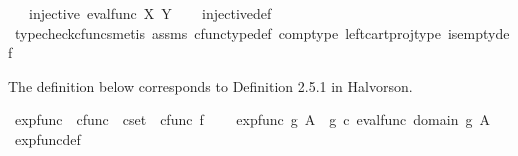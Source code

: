 \begin{isabellebody}
\ \ \ {\isachardoublequoteopen}injective\ {\isacharparenleft}{\kern0pt}eval{\isacharunderscore}{\kern0pt}func\ X\ Y{\isacharparenright}{\kern0pt}{\isachardoublequoteclose}\isanewline
%
\isadelimproof
\ \ %
\endisadelimproof
%
\isatagproof
{}\isamarkupfalse%
\ injective{\isacharunderscore}{\kern0pt}def\isanewline
\ \ \isamarkupfalse%
\ {\isacharparenleft}{\kern0pt}typecheck{\isacharunderscore}{\kern0pt}cfuncs{\isacharcomma}{\kern0pt}metis\ assms\ cfunc{\isacharunderscore}{\kern0pt}type{\isacharunderscore}{\kern0pt}def\ comp{\isacharunderscore}{\kern0pt}type\ left{\isacharunderscore}{\kern0pt}cart{\isacharunderscore}{\kern0pt}proj{\isacharunderscore}{\kern0pt}type\ is{\isacharunderscore}{\kern0pt}empty{\isacharunderscore}{\kern0pt}def{\isacharparenright}{\kern0pt}%
\endisatagproof
{\isafoldproof}%
%
\isadelimproof
%
\endisadelimproof
%
\isadelimdocument
%
\endisadelimdocument
%
\isatagdocument
%
\isamarkuptrue%
%
\endisatagdocument
{\isafolddocument}%
%
\isadelimdocument
%
\endisadelimdocument
%
\begin{isamarkuptext}%
The definition below corresponds to Definition 2.5.1 in Halvorson.%
\end{isamarkuptext}\isamarkuptrue%
\isamarkupfalse%
\ exp{\isacharunderscore}{\kern0pt}func\ {\isacharcolon}{\kern0pt}{\isacharcolon}{\kern0pt}\ {\isachardoublequoteopen}cfunc\ {\isasymRightarrow}\ cset\ {\isasymRightarrow}\ cfunc{\isachardoublequoteclose}\ {\isacharparenleft}{\kern0pt}{\isachardoublequoteopen}{\isacharparenleft}{\kern0pt}{\isacharunderscore}{\kern0pt}{\isacharparenright}{\kern0pt}\isactrlbsup {\isacharunderscore}{\kern0pt}\isactrlesup \isactrlsub f{\isachardoublequoteclose}\ {\isacharbrackleft}{\kern0pt}{}{}{}{\isacharcomma}{\kern0pt}{}{}{}{\isacharbrackright}{\kern0pt}{}{}{}{\isacharparenright}{\kern0pt}\ \isanewline
\ \ {\isachardoublequoteopen}exp{\isacharunderscore}{\kern0pt}func\ g\ A\ {\isacharequal}{\kern0pt}\ {\isacharparenleft}{\kern0pt}g\ {\isasymcirc}\isactrlsub c\ eval{\isacharunderscore}{\kern0pt}func\ {\isacharparenleft}{\kern0pt}domain\ g{\isacharparenright}{\kern0pt}\ A{\isacharparenright}{\kern0pt}\isactrlsup {\isasymsharp}{\isachardoublequoteclose}\isanewline
\isanewline
{}\isamarkupfalse%
\ exp{\isacharunderscore}{\kern0pt}func{\isacharunderscore}{\kern0pt}def{}{\isacharcolon}{\kern0pt}\isanewline

\end{isabellebody}

